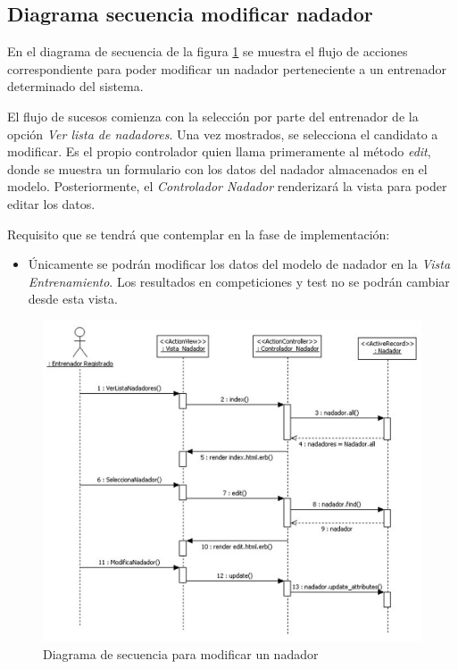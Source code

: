 		\subsection{Diagrama secuencia modificar nadador} %
		  \label{sub:diagrama_secuencia_modificar_nadador}
		  
		  En el diagrama de secuencia de la figura \ref{fig:di_sec_modificarnadador} se muestra el flujo de acciones correspondiente para poder modificar un nadador perteneciente a un entrenador determinado del sistema.
		  
		  El flujo de sucesos comienza con la selección por parte del entrenador de la opción {\it Ver lista de nadadores}. Una vez mostrados, se selecciona el candidato a modificar. Es el propio controlador quien llama primeramente al método {\it edit}, donde se muestra un formulario con los datos del nadador almacenados en el modelo. Posteriormente, el {\it Controlador Nadador} renderizará la vista para poder editar los datos.
		
		  Requisito que se tendrá que contemplar en la fase de implementación:
			
			\begin{itemize}
			 \item Únicamente se podrán modificar los datos del modelo de nadador en la {\it Vista Entrenamiento}. Los resultados en competiciones y test no se podrán cambiar desde esta vista.
			\end{itemize}
			
		  \begin{figure}[H]
			  \centering
			    \includegraphics[width=15cm]{./eps/di_diagsecuencia/Nadador_Modificar.eps}
			  \caption{Diagrama de secuencia para modificar un nadador}
			  \label{fig:di_sec_modificarnadador}
			\end{figure}
			
